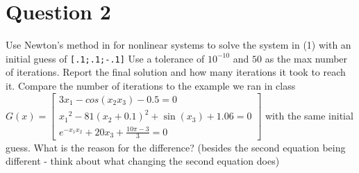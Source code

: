 \section{Question 2}

\begin{question}
    Use Newton’s method in \MATLAB for nonlinear systems to solve the system in (1) with an initial guess of \verb+[.1;.1;-.1]+ Use a tolerance of $10^{−10}$ and $50$ as the max number of iterations. Report the final solution and how many iterations it took to reach it. Compare the number of iterations to the example we ran in class $G(x) = \left[\begin{smallmatrix}3x_1 − cos(x_2x_3) − 0.5 = 0\\  {x_1}^2 −  81{(x_2+0.1)}^2 + \sin{(x_3)}+ 1.06 = 0\\ e^{−x_1x_2} + 20x_3 + \tfrac{10\pi−3}{3}  = 0\end{smallmatrix}\right]$ with the same initial guess. What is the reason for the difference? (besides the second equation being different - think about what changing the second equation does)
\end{question}

